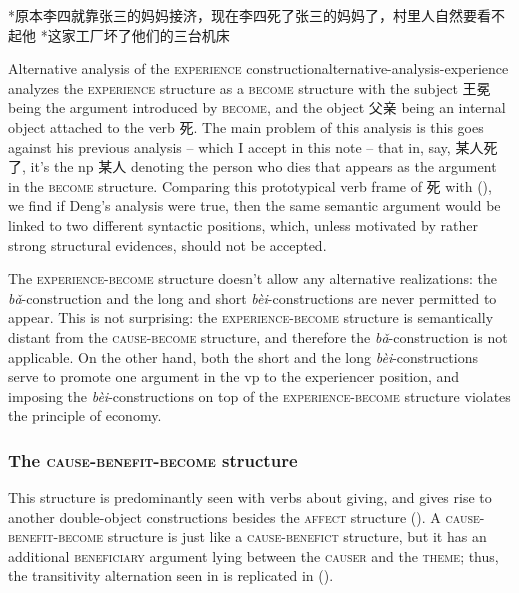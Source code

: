\documentclass[UTF8, a4paper, oneside, scheme=plain, 12pt]{ctexrep}
\newcommand*{\citesec}[1]{\S~{#1}}
\newcommand{\form}[1]{\emph{#1}}
\newcommand*{\category}[1]{\textsc{#1}}
\begin{document}
\begin{exe}
    \ex\label{ex:verb-phrase.experience.3} *原本李四就靠张三的妈妈接济，现在李四死了张三的妈妈了，村里人自然要看不起他
    \ex\label{ex:verb-phrase.experience-4} *这家工厂坏了他们的三台机床
\end{exe}

\begin{infobox}{Alternative analysis of the \category{experience} construction}{alternative-analysis-experience}
    \citet[\citesec{212}]{deng2010formal} analyzes the \category{experience} structure 
    as a \category{become} structure with 
    the subject 王冕 being the argument introduced by \category{become},
    and the object 父亲 being an internal object attached to the verb 死.
    The main problem of this analysis is 
    this goes against his previous analysis -- 
    which I accept in this note -- 
    that in, say, 某人死了, it's the \acs{np} 某人 denoting the person who dies that 
    appears as the argument in the \category{become} structure.
    Comparing this prototypical verb frame of 死 
    with (),
    we find if Deng's analysis were true,
    then the same semantic argument would be linked to two different syntactic positions,
    which, unless motivated by rather strong structural evidences, 
    should not be accepted.
\end{infobox}

The \category{experience}-\category{become} structure 
doesn't allow any alternative realizations:
the \form{bǎ}-construction and the long and short \form{bèi}-constructions
are never permitted to appear.
This is not surprising:
the \category{experience}-\category{become} structure 
is semantically distant from the \category{cause}-\category{become} structure,
and therefore the \form{bǎ}-construction 
is not applicable.
On the other hand,
both the short and the long \form{bèi}-constructions 
serve to promote one argument in the \acs{vp} 
to the experiencer position,
and imposing the \form{bèi}-constructions 
on top of the \category{experience}-\category{become} structure
violates the principle of economy.

\subsubsection{The \category{cause}-\category{benefit}-\category{become} structure}\label{sec:verb-phrase.dative}

This structure is predominantly seen with verbs about giving,
and gives rise to another double-object constructions 
besides the \category{affect} structure
().
A \category{cause}-\category{benefit}-\category{become} structure
is just like a \category{cause}-\category{benefict} structure,
but it has an additional \category{beneficiary} argument 
lying between the \category{causer} and the \category{theme};
thus, the transitivity alternation seen in 
is replicated in 
().
\end{document}
